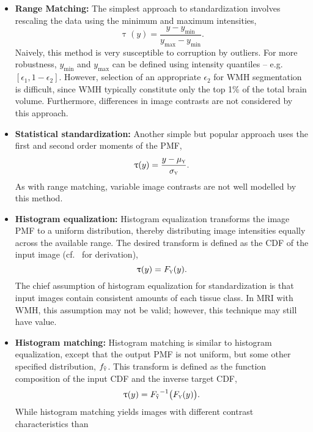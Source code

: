 \begin{itemize}
  \item \textbf{Range Matching:}
  The simplest approach to standardization involves
  rescaling the data using the minimum and maximum intensities,
  \begin{equation}
    \uptau(y) = \frac{y-y_{\min}}{y_{\max}-y_{\min}}.
  \end{equation}
  Naively, this method is very susceptible to corruption by outliers.
  For more robustness, $y_{\min}$ and $y_{\max}$ can be defined using intensity quantiles
  -- e.g.\ $[\epsilon_1,1-\epsilon_2]$.
  However, selection of an appropriate $\epsilon_2$ for WMH segmentation is difficult,
  since WMH typically constitute only the top 1\% of the total brain volume.
  Furthermore, differences in image contrasts are not considered by this approach.
  \item \textbf{Statistical standardization:}
  Another simple but popular approach uses the first and second order moments of the PMF,
  \begin{equation}
    \uptau(y) = \frac{y-\mu_{\textsc{y}}}{\sigma_{\textsc{y}}}.
  \end{equation}
  As with range matching, variable image contrasts are not well modelled by this method.
  \item \textbf{Histogram equalization:}
  Histogram equalization transforms the image PMF to a uniform distribution,
  thereby distributing image intensities equally across the available range.
  The desired transform  is defined as the CDF of the input image
  (cf.~\cite{Gonzalez2006} for derivation),
  \begin{equation}
    \uptau(y) = F_{\textsc{y}}(y).
  \end{equation}
  The chief assumption of histogram equalization for standardization is
  that input images contain consistent amounts of each tissue class.
  In MRI with WMH, this assumption may not be valid;
  however, this technique may still have value.
  \item \textbf{Histogram matching:}
  Histogram matching is similar to histogram equalization, except that
  the output PMF is not uniform, but some other specified distribution, $f_{\tilde{\textsc{y}}}$.
  This transform is defined as
  the function composition of the input CDF and the inverse target CDF,
  \begin{equation}
    \uptau(y) = {F_{\tilde{\textsc{y}}}}^{-1}\big(F_{\textsc{y}}(y)\big).
  \end{equation}
  While histogram matching yields images with different contrast characteristics than

\end{itemize}
